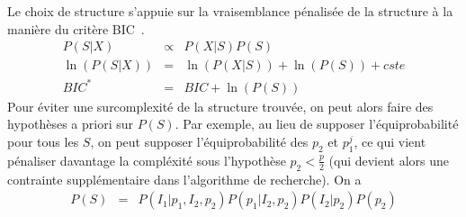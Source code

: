 \documentclass[12pt]{article}
\begin{document}
		Le choix de structure s'appuie sur la vraisemblance pénalisée de la structure à la manière du critère BIC~\cite{BIChuard}. 
		\begin{eqnarray}
		P(S|X)&\propto &P(X|S)P(S) \\
		\ln(P(S|X))&=&\ln(P(X|S))+\ln(P(S))+cste \\
		BIC^*&=&BIC +\ln(P(S)) \label{Bicstar}
	\end{eqnarray}	
	Pour éviter une surcomplexité de la structure trouvée, on peut alors faire des hypothèses a priori sur $P(S)$. Par exemple, au lieu de supposer l'équiprobabilité pour tous les $S$, on peut supposer l'équiprobabilité des $p_2$ et $p_1^j$, ce qui vient pénaliser davantage la compléxité sous l'hypothèse $p_2<\frac{p}{2}$ (qui devient alors une contrainte supplémentaire dans l'algorithme de recherche). 
	On a
	\begin{eqnarray}
		P(S)&=&P(I_1 | p_1,I_2,p_2)P(p_1|I_2,p_2)P(I_2|p_2)P(p_2) %
	\end{eqnarray}		
\end{document}
